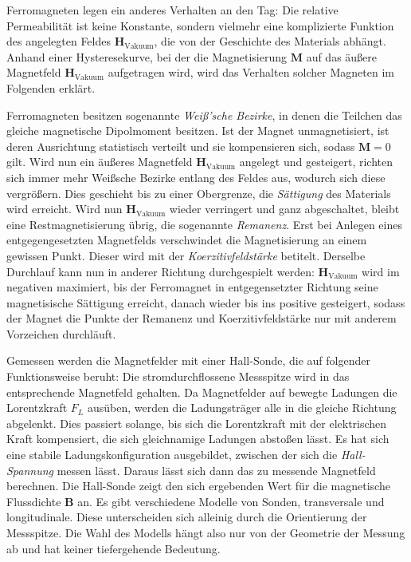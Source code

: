 Ferromagneten legen ein anderes Verhalten an den Tag: Die relative Permeabilität ist keine Konstante, sondern vielmehr 
eine komplizierte Funktion des angelegten Feldes $\symbf{H}_\text{Vakuum}$, die von der Geschichte des Materials abhängt. 
Anhand einer Hysteresekurve, bei der die Magnetisierung $\symbf{M}$ auf das äußere Magnetfeld $\symbf{H}_\text{Vakuum}$ 
aufgetragen wird, wird das Verhalten solcher Magneten im Folgenden erklärt. 

Ferromagneten besitzen sogenannte \textit{Weiß'sche Bezirke}, in denen die Teilchen das gleiche magnetische Dipolmoment besitzen. 
Ist der Magnet unmagnetisiert, ist deren Ausrichtung statistisch verteilt und sie kompensieren sich, sodass $\symbf{M}=0$ gilt.
Wird nun ein äußeres Magnetfeld $\symbf{H}_\text{Vakuum}$ angelegt und gesteigert, richten sich immer mehr Weißsche Bezirke entlang des 
Feldes aus, wodurch sich diese vergrößern. 
Dies geschieht bis zu einer Obergrenze, die \textit{Sättigung} des Materials wird erreicht. 
Wird nun $\symbf{H}_\text{Vakuum}$ wieder verringert und ganz abgeschaltet, bleibt eine Restmagnetisierung übrig, 
die sogenannte \textit{Remanenz}. 
Erst bei Anlegen eines entgegengesetzten Magnetfelds verschwindet die Magnetisierung an einem gewissen Punkt. 
Dieser wird mit der \textit{Koerzitivfeldstärke} betitelt. 
Derselbe Durchlauf kann nun in anderer Richtung durchgespielt werden: $\symbf{H}_\text{Vakuum}$ wird im negativen 
maximiert, bis der Ferromagnet in entgegensetzter Richtung seine magnetisische Sättigung erreicht, danach wieder 
bis ins positive gesteigert, sodass der Magnet die Punkte der Remanenz und Koerzitivfeldstärke nur mit anderem Vorzeichen 
durchläuft. 

Gemessen werden die Magnetfelder mit einer Hall-Sonde, die auf folgender Funktionsweise beruht:
Die stromdurchflossene Messspitze wird in das entsprechende Magnetfeld gehalten. 
Da Magnetfelder auf bewegte Ladungen die Lorentzkraft $F_L$ ausüben, werden die Ladungsträger alle in die gleiche Richtung
abgelenkt. Dies passiert solange, bis sich die Lorentzkraft mit der elektrischen Kraft kompensiert, die sich gleichnamige 
Ladungen abstoßen lässt. Es hat sich eine stabile Ladungskonfiguration ausgebildet, zwischen der sich die \textit{Hall-Spannung} 
messen lässt. Daraus lässt sich dann das zu messende Magnetfeld berechnen. Die Hall-Sonde zeigt den sich ergebenden Wert 
für die magnetische Flussdichte $\symbf{B}$ an. 
Es gibt verschiedene Modelle von Sonden, transversale und longitudinale. Diese unterscheiden sich alleinig durch die 
Orientierung der Messspitze. Die Wahl des Modells hängt also nur von der Geometrie der Messung ab und hat keiner tiefergehende Bedeutung.

